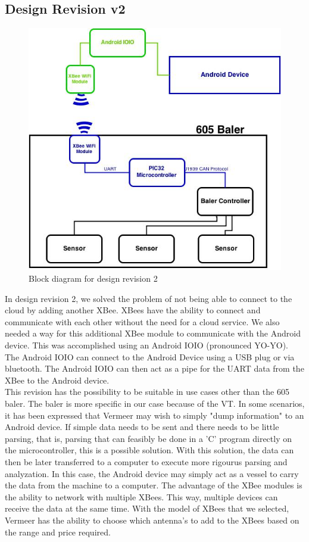 \documentclass[paper=a4, fontsize=11pt]{scrartcl}
\numberwithin{equation}{section}		%
\numberwithin{figure}{section}			%
\numberwithin{table}{section}				%
\begin{document}
\subsection{Design Revision v2} 
 \begin{figure}[H]
	 \center\includegraphics[scale=0.4]{rev2.jpg}
 \caption{Block diagram for design revision 2}
 \end{figure}
In design revision 2, we solved the problem of not being able to connect to the cloud by adding another XBee. XBees have the ability to connect and communicate with each other without the need for a cloud service. We also needed a way for this additional XBee module to communicate with the Android device. This was accomplished using an Android IOIO (pronounced YO-YO). The Android IOIO can connect to the Android Device using a USB plug or via bluetooth. The Android IOIO can then act as a pipe for the UART data from the XBee to the Android device. \\

This revision has the possibility to be suitable in use cases other than the 605 baler. The baler is more specific in our case because of the VT. In some scenarios, it has been expressed that Vermeer may wish to simply "dump information" to an Android device. If simple data needs to be sent and there needs to be little parsing, that is, parsing that can feasibly be  done in a 'C' program directly on the microcontroller, this is a possible solution. With this solution, the data can then be later transferred to a computer to execute more rigourus parsing and analyzation. In this case, the Android device may simply act as a vessel to carry the data from the machine to a computer. The advantage of the XBee modules is the ability to network with multiple XBees. This way, multiple devices can receive the data at the same time. With the model of XBees that we selected, Vermeer has the ability to choose which antenna's to add to the XBees based on the range and price required. \\
\end{document}
